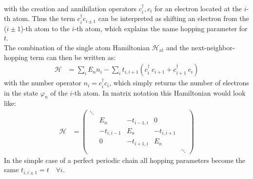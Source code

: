 with the creation and annihilation operators $c^\dagger_i, c_i$ for an electron located at the $i$-th atom. Thus the term $c_i^\dagger c_{i\pm1}$ can be interpreted as shifting an electron from the ($i\pm1$)-th atom to the $i$-th atom, which explains the name hopping parameter for $t$.\\
The combination of the single atom Hamiltonian $\mathcal{H}_\text{at}$ and the next-neighbor-hopping term can then be written as:
\begin{align}
	\mathcal{H} &= \sum_i E_n n_i - \sum_i t_{i, i+1} \left(c_i^\dagger\  c_{i+1} + c_{i+1}^\dagger\  c_i\right)
\end{align}
with the number operator $n_i = c^\dagger_i c_i$, which simply returns the number of electrons in the state $\varphi_n$ of the $i$-th atom. In matrix notation this Hamiltonian would look like:
\begin{align}
	\mathcal{H} &= \begin{pmatrix*}
	\ddots&&&\\
	&E_n&-t_{i-1, i}&0\\
	&-t_{i, i-1}&E_n&-t_{i, i+1}\\
	&0&-t_{i+1, i}&E_n&\\
	&&&&\ddots
	\end{pmatrix*}
\end{align}
In the simple case of a perfect periodic chain all hopping parameters become the same $t_{i, i\pm1} = t\quad\forall  i$. 

